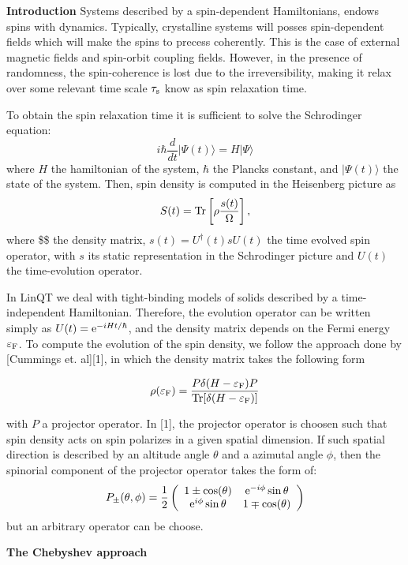 {\bfseries Introduction} Systems described by a spin-\/dependent Hamiltonians, endows spins with dynamics. Typically, crystalline systems will posses spin-\/dependent fields which will make the spins to precess coherently. This is the case of external magnetic fields and spin-\/orbit coupling fields. However, in the presence of randomness, the spin-\/coherence is lost due to the irreversibility, making it relax over some relevant time scale $\tau_{\rm s}$ know as spin relaxation time.

To obtain the spin relaxation time it is sufficient to solve the Schrodinger equation\+: \[ i\hbar \frac{d}{dt}|\Psi(t)\rangle = H |\Psi\rangle \] where $H$ the hamiltonian of the system, $\hbar$ the Planck\textquotesingle{}s constant, and $|\Psi(t)\rangle$ the state of the system. Then, spin density is computed in the Heisenberg picture as \[ S( t) = {\rm Tr}\left[ \rho\frac{s(t)}{\Omega} \right], \] where \$\$ the density matrix, $s(t)=U^\dagger(t) s U(t)$ the time evolved spin operator, with $s$ its static representation in the Schrodinger picture and $U(t)$ the time-\/evolution operator.

In Lin\+QT we deal with tight-\/binding models of solids described by a time-\/independent Hamiltonian. Therefore, the evolution operator can be written simply as $U(t) = {\rm e}^{-i H t/\hbar}$, and the density matrix depends on the Fermi energy $\varepsilon_{\rm F}$. To compute the evolution of the spin density, we follow the approach done by \mbox{[}Cummings et. al\mbox{]}\mbox{[}1\mbox{]}, in which the density matrix takes the following form

\[ \rho(\varepsilon_{\rm F}) = \frac{ P \delta(H-\varepsilon_{\rm F}) P }{ {\rm Tr}[\delta(H-\varepsilon_{\rm F})] } \]

with $ P $ a projector operator. In \mbox{[}1\mbox{]}, the projector operator is choosen such that spin density acts on spin polarizes in a given spatial dimension. If such spatial direction is described by an altitude angle $\theta$ and a azimutal angle $\phi$, then the spinorial component of the projector operator takes the form of\+: \[ P_{\pm}(\theta,\phi) =\frac{1}{2} \left(\begin{array}{cc} 1\pm \cos(\theta) & {\rm e}^{-i\phi}\sin\theta \\ {\rm e}^{i\phi}\sin\theta &1\mp \cos(\theta) \end{array} \right) \] but an arbitrary operator can be choose.

{\bfseries The Chebyshev approach}

